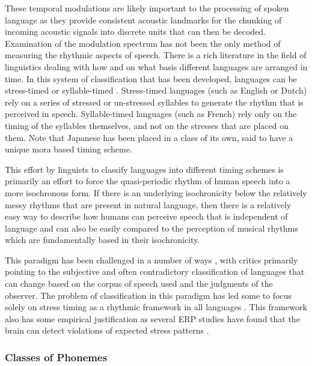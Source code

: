 \documentclass[titlepage]{article}
\begin{document}
    These temporal modulations are likely important to the processing of 
    spoken language as they provide consistent acoustic landmarks for the 
    chunking of incoming acoustic signals into discrete units that can then be 
    decoded. Examination of the modulation spectrum has not been the only 
    method of measuring the rhythmic 
    aspects of speech. There is a rich literature in the field of linguistics 
    dealing with how and on what basis different languages are arranged in time.
    In this system of classification that has been developed, languages can be 
    stress-timed or syllable-timed \cite{Nakatani1981,Dauer1983}. Stress-timed 
    languages (such as English or Dutch) rely on a series of stressed or 
    un-stressed syllables to generate the rhythm that is perceived in speech. 
    Syllable-timed languages (such as French) rely only on the timing of the 
    syllables themselves, and not on the stresses that are placed on them. Note
    that Japanese has been placed in a class of its own, said to have a unique 
    mora based timing scheme.

    This effort by linguists to classify languages into different timing 
    schemes is primarily an effort to force the quasi-periodic rhythm of human 
    speech into a more isochronous form. If there is an underlying isochronicity
    below the relatively messy rhythms that are present in natural language, 
    then there is a relatively easy way to describe how humans can perceive 
    speech that is independent of language and can also be easily compared to 
    the perception of musical rhythms which are fundamentally based in their 
    isochronicity. 

    This paradigm has been challenged in a number of ways 
    \cite{Ramus1999,Grabe2002}, with critics primarily pointing to the 
    subjective and often contradictory classification of languages that can 
    change based on the corpus of speech used and the judgments of the 
    observer. The problem of classification in this paradigm has led some 
    to focus solely on stress timing as a rhythmic framework in all languages 
    \cite{Hayes198433,Martin1972}. This framework also has some empirical 
    justification as several ERP studies have found that the brain can detect 
    violations of expected stress patterns 
    \cite{Rothermich2012,Knaus2007,Haegens2018}.
    
    \subsubsection{Classes of Phonemes}
\end{document}
